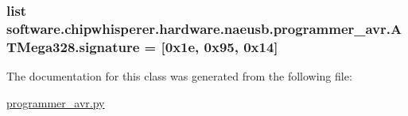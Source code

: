 \subsubsection[{signature}]{\setlength{\rightskip}{0pt plus 5cm}list software.\+chipwhisperer.\+hardware.\+naeusb.\+programmer\+\_\+avr.\+A\+T\+Mega328.\+signature = \mbox{[}0x1e, 0x95, 0x14\mbox{]}\hspace{0.3cm}{\ttfamily [static]}}\label{classsoftware_1_1chipwhisperer_1_1hardware_1_1naeusb_1_1programmer__avr_1_1ATMega328_a658db9ba7e3a3e6b1a4bc1b3ce66a915}


The documentation for this class was generated from the following file\+:\begin{DoxyCompactItemize}
\item 
\hyperlink{programmer__avr_8py}{programmer\+\_\+avr.\+py}\end{DoxyCompactItemize}
